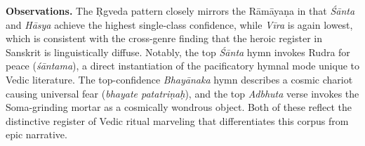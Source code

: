 \documentclass[11pt]{article}
\begin{document}
\noindent\textbf{Observations.} The \d Rgveda pattern closely mirrors the R\=am\=aya\d na in that \textit{Ś\=anta} and \textit{H\=asya} achieve the highest single-class confidence, while \textit{V\=ira} is again lowest, which is consistent with the cross-genre finding that the heroic register in Sanskrit is linguistically diffuse. Notably, the top \textit{Ś\=anta} hymn invokes Rudra for peace (\textit{ś\=antama}), a direct instantiation of the pacificatory hymnal mode unique to Vedic literature. The top-confidence \textit{Bhay\=anaka} hymn describes a cosmic chariot causing universal fear (\textit{bhayate patatriṇaḥ}), and the top \textit{Adbhuta} verse invokes the Soma-grinding mortar as a cosmically wondrous object. Both of these reflect the distinctive register of Vedic ritual marveling that differentiates this corpus from epic narrative.
\end{document}
